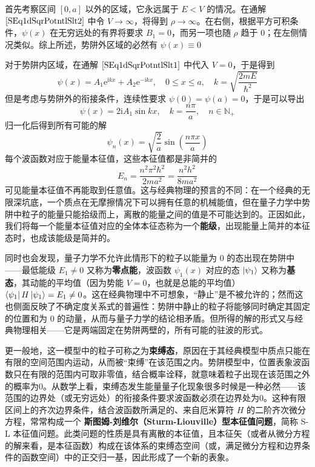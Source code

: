 \documentclass[cn,10pt,math=newtx,citestyle=gb7714-2015,bibstyle=gb7714-2015]{elegantbook}
\def\e{\mathrm e}
\def\i{\mathrm i}
\def\N{\mathbb N}
\def\ra{\rightarrow}
\begin{document}
首先考察区间 $[0,a]$ 以外的区域，它永远属于 $E<V$ 的情况。在通解 $\ref{SEq1dSqrPotntlSlt2}$ 中令 $V\ra\infty$，将得到 $\rho\ra\infty$。在右侧，根据平方可积条件，$\psi(x)$ 在无穷远处的有界将要求 $B_1=0$，而另一项也随 $\rho$ 趋于 $0$；在左侧情况类似。综上所述，势阱外区域的必然有 $\psi(x)\equiv 0$

对于势阱内区域，在通解 $\ref{SEq1dSqrPotntlSlt1}$ 中代入 $V=0$，于是得到
\begin{equation}
    \psi(x)=A_1\e^{\i kx}+A_2\e^{-\i kx},\quad 0\le x\le a,\quad k=\sqrt{\frac{2mE}{\hbar^2}}
\end{equation}
但是考虑与势阱外的衔接条件，连续性要求 $\psi(0)=\psi(a)=0$，于是可以导出
\begin{equation}
    \psi(x)=2\i A_1\sin kx,\quad k=\frac{n\pi}{a},\quad n\in\N_+
\end{equation}
归一化后得到所有可能的解
\begin{equation}\label{eq:1d_infnt_ptntl_wll_wv_fnctn}
    \psi_n(x)=\sqrt{\frac 2 a}\sin\left(\frac{n\pi x}{a}\right)
\end{equation}
每个波函数对应于能量本征值，这些本征值都是非简并的
\begin{equation}\label{eq:1d_infnt_ptntl_wll_egnvl}
    E_n=\frac{n^2\pi^2\hbar^2}{2ma^2}=\frac{n^2h^2}{8ma^2}
\end{equation}
可见能量本征值不再能取到任意值。这与经典物理的预言的不同：在一个经典的无限深坑底，一个质点在无摩擦情况下可以拥有任意的机械能值，但在量子力学中势阱中粒子的能量只能拾级而上，离散的能量之间的值是不可能达到的。正因如此，我们将每一个能量本征值对应的全体本征态称为一个\textbf{能级}，出现能量上简并的本征态时，也成该能级是简并的。

同时也会发现，量子力学不允许此情形下的粒子以能量为 $0$ 的态出现在势阱中——最低能级 $E_1\ne 0$ 又称为\textbf{零点能}，波函数 $\psi_1(x)$ 对应的态 $\ket{\psi_1}$ 又称为\textbf{基态}，其动能的平均值（因为势能 $V=0$，也就是总能的平均值）$\bra{\psi_1}H\ket{\psi_1}=E_1\ne 0$。这在经典物理中不可想象，“静止”是不被允许的；然而这也侧面反映了不确定度关系式的普遍性：势阱中静止的粒子将能够同时确定其固定的位置和为 0 的动量，从而与量子力学的结论相矛盾。但所得的解的形式又与经典物理相关——它是两端固定在势阱两壁的，所有可能的驻波的形式。

更一般地，这一模型中的粒子可称之为\textbf{束缚态}，原因在于其经典模型中质点只能在有限的空间范围内运动，从而被“束缚”在该范围之内。势阱模型中，位置表象波函数只在有限的范围内可取非零值，结合概率诠释，就意味着粒子出现在该范围之外的概率为0。从数学上看，束缚态发生能量量子化现象很多时候是一种必然——该范围的边界处（或无穷远处）的衔接条件要求波函数必须在边界处为0。这种有限区间上的齐次边界条件，结合波函数所满足的、来自厄米算符 $H$ 的二阶齐次微分方程，常常构成一个 \textbf{斯图姆-刘维尔（Sturm-Liouville）型本征值问题}，简称 S-L 本征值问题。此类问题的性质是具有离散的本征值，且本征矢（或者从微分方程的解来看，是本征函数）构成在该体系的束缚态空间（或，满足微分方程和边界条件的函数空间）中的正交归一基，因此形成了一个新的表象。
\end{document}

